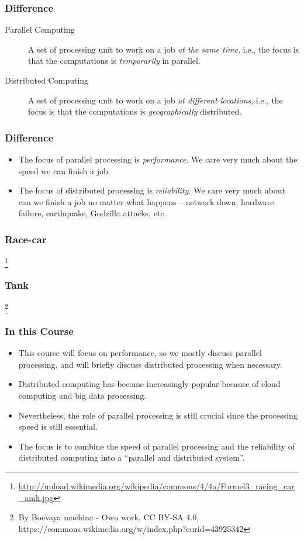 \documentclass{beamer}
\begin{document}
\begin{CJK}{UTF8}{bsmi}
\begin{frame}
\frametitle{Difference}
\begin{description}
\item[Parallel Computing] A set of processing unit to work on a job
  {\em at the same time}, i.e., the focus is that the computations is
  {\em temporarily} in parallel.
\item[Distributed Computing] A set of processing unit to work on a job
  {\em at different locations}, i.e., the focus is that the
  computations is {\em geographically} distributed.
\end{description}
\end{frame}

\begin{frame}
\frametitle{Difference}
\begin{itemize}
\item The focus of parallel processing is {\em performance}.  We care
  very much about the speed we can finish a job.
\item The focus of distributed processing is {\em reliability}.  We care
  very much about can we finish a job no matter what happens --
  network down, hardware failure, earthquake, Godzilla attacks, etc.
\end{itemize}
\end{frame}

\begin{frame}
\frametitle{Race-car}
\centerline{}
\footnote{\url{http://upload.wikimedia.org/wikipedia/commons/4/4a/Formel3_racing_car_amk.jpg}}
\end{frame}

\begin{frame}
\frametitle{Tank}
\centerline{}
\footnote{
By Boevaya mashina - Own work, CC BY-SA 4.0, https://commons.wikimedia.org/w/index.php?curid=43925342
}
\end{frame}

\begin{frame}
\frametitle{In this Course}
\begin{itemize}
\item This course will focus on performance, so we mostly discuss
  parallel processing, and will briefly discuss distributed processing
  when necessary.
\item Distributed computing has become increasingly popular because of
  cloud computing and big data processing.
\item Nevertheless, the role of parallel processing is still crucial
  since the processing speed is still essential.
\item The focus is to combine the speed of parallel processing and the
  reliability of distributed computing into a ``parallel and
  distributed system''.
\end{itemize}
\end{frame}


\end{CJK}
\end{document}
